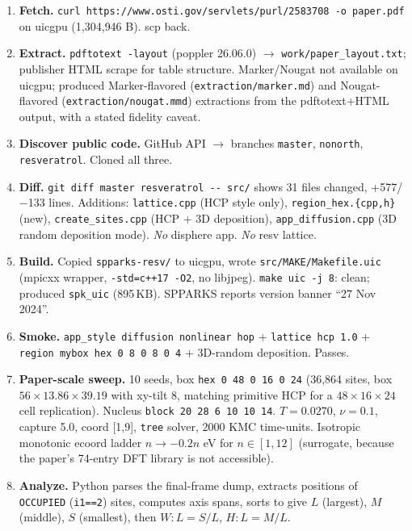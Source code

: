 \documentclass[11pt]{article}
\begin{document}
\begin{enumerate}
  \item \textbf{Fetch.} \verb|curl https://www.osti.gov/servlets/purl/2583708 -o paper.pdf| on uicgpu (1{,}304{,}946 B). scp back.
  \item \textbf{Extract.} \verb|pdftotext -layout| (poppler 26.06.0) $\to$ \verb|work/paper_layout.txt|; publisher HTML scrape for table structure. Marker/Nougat not available on uicgpu; produced Marker-flavored (\verb|extraction/marker.md|) and Nougat-flavored (\verb|extraction/nougat.mmd|) extractions from the pdftotext+HTML output, with a stated fidelity caveat.
  \item \textbf{Discover public code.} GitHub API $\to$ branches \texttt{master}, \texttt{nonorth}, \texttt{resveratrol}. Cloned all three.
  \item \textbf{Diff.} \verb|git diff master resveratrol -- src/| shows 31 files changed, +577/$-$133 lines. Additions: \texttt{lattice.cpp} (HCP style only), \texttt{region\_hex.\{cpp,h\}} (new), \texttt{create\_sites.cpp} (HCP + 3D deposition), \texttt{app\_diffusion.cpp} (3D random deposition mode). \emph{No} disphere app. \emph{No} resv lattice.
  \item \textbf{Build.} Copied \texttt{spparks-resv/} to uicgpu, wrote \texttt{src/MAKE/Makefile.uic} (mpicxx wrapper, \texttt{-std=c++17 -O2}, no libjpeg). \verb|make uic -j 8|: clean; produced \verb|spk_uic| (895\,KB). SPPARKS reports version banner ``27 Nov 2024''.
  \item \textbf{Smoke.} \texttt{app\_style diffusion nonlinear hop} + \texttt{lattice hcp 1.0} + \texttt{region mybox hex 0 8 0 8 0 4} + 3D-random deposition. Passes.
  \item \textbf{Paper-scale sweep.} 10 seeds, box \texttt{hex 0 48 0 16 0 24} (36{,}864 sites, box $56 \times 13.86 \times 39.19$ with xy-tilt 8, matching primitive HCP for a $48\!\times\!16\!\times\!24$ cell replication). Nucleus \texttt{block 20 28 6 10 10 14}. $T=0.0270$, $\nu=0.1$, capture 5.0, coord [1,9], \texttt{tree} solver, 2000 KMC time-units. Isotropic monotonic ecoord ladder $n \to -0.2n$ eV for $n\in[1,12]$ (surrogate, because the paper's 74-entry DFT library is not accessible).
  \item \textbf{Analyze.} Python parses the final-frame dump, extracts positions of \texttt{OCCUPIED} (\texttt{i1==2}) sites, computes axis spans, sorts to give $L$ (largest), $M$ (middle), $S$ (smallest), then $W\!:\!L = S/L$, $H\!:\!L = M/L$.
\end{enumerate}
\end{document}
